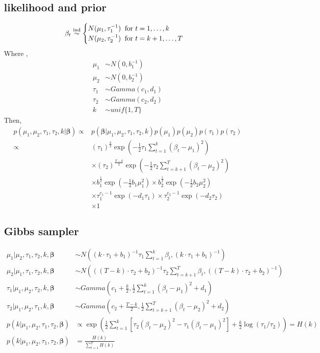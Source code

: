 \documentclass[11pt]{article}
\begin{document}
	\subsection{likelihood and prior}
	\begin{align*}
		\beta_t &\stackrel{\rm ind}{\sim} \begin{cases}
		N(\mu_1, \tau_1^{-1}) \;\; \text{for } t = 1,\dots,k\\
		N(\mu_2, \tau_2^{-1}) \;\; \text{for } t = k+1,\dots,T
		\end{cases}\\
	\end{align*}
	Where ,
	\begin{align*}
		\mu_1 &\sim N(0, b_1^{-1})\\
		\mu_2 &\sim N(0, b_2^{-1})\\
		\tau_1 &\sim Gamma(c_1, d_1)\\
		\tau_2 &\sim Gamma(c_2, d_2)\\
		k &\sim unif\{1,T\}
	\end{align*}
	Then,
	\begin{align*}
		p(\mu_1, \mu_2,\tau_1,\tau_2,k  | \boldsymbol{\beta})\propto& p(\boldsymbol{\beta} | \mu_1, \mu_2,\tau_1,\tau_2,k ) p(\mu_1) p(\mu_2) p(\tau_1)p(\tau_2)\\
		\propto& (\tau_1)^{\frac{k}{2}} \exp\left(-\frac{1}{2} \tau_1 \sum_{t=1}^{k}(\beta_t - \mu_1)^2\right)\\
		&\times (\tau_2)^{\frac{T-k}{2}} \exp\left(-\frac{1}{2} \tau_2 \sum_{t=k+1}^{T}(\beta_t - \mu_2)^2\right)\\
		&\times b_1^{\frac{1}{2}} \exp\left(-\frac{1}{2}b_1 \mu_1^2\right) \times b_2^{\frac{1}{2}} \exp\left(-\frac{1}{2}b_2 \mu_2^2\right)\\
		&\times \tau_1^{c_1-1} \exp(-d_1 \tau_1) \times \tau_2^{c_2-1} \exp(-d_2 \tau_2)\\
		&\times 1
	\end{align*}
	\subsection{Gibbs sampler}
	\begin{align*}
		\mu_1 | \mu_2,\tau_1,\tau_2,k,\boldsymbol{\beta} &\sim N\left((k \cdot \tau_1+b_1)^{-1}\tau_1\sum_{t=1}^{k}\beta_t ,(k \cdot \tau_1+b_1)^{-1}\right)\\
		\mu_2 | \mu_1,\tau_1,\tau_2,k,\boldsymbol{\beta} &\sim N\left(((T-k) \cdot \tau_2+b_2)^{-1}\tau_2\sum_{t=k+1}^{T}\beta_t ,((T-k) \cdot \tau_2+b_2)^{-1}\right)\\
		\tau_1 | \mu_1 ,\mu_2,\tau_2,k,\boldsymbol{\beta} & \sim Gamma\left(c_1 + \frac{k}{2}, \frac{1}{2} \sum_{t=1}^k (\beta_t - \mu_1)^2 +d_1\right)\\
		\tau_2 | \mu_1 ,\mu_2,\tau_1,k,\boldsymbol{\beta} & \sim Gamma\left(c_2 + \frac{T-k}{2}, \frac{1}{2} \sum_{t=k+1}^T (\beta_t - \mu_2)^2 +d_2\right)\\
		p(k | \mu_1,\mu_2,\tau_1,\tau_2,\boldsymbol{\beta}) & \propto \exp\left(\frac{1}{2} \sum_{t=1}^k \left[ \tau_2(\beta_t - \mu_2)^2 - \tau_1 (\beta_t - \mu_1)^2\right] + \frac{k}{2} \log(\tau_1/\tau_2)\right) = H(k)\\
		p(k | \mu_1,\mu_2,\tau_1,\tau_2,\boldsymbol{\beta}) &= \frac{H(k)}{\sum_{t=1}^T H(k)}
	\end{align*}
\end{document}
